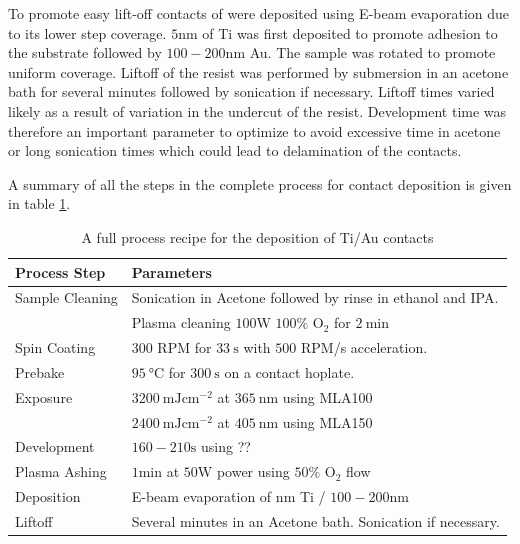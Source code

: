 To promote easy lift-off contacts of were deposited using E-beam evaporation due to its lower step coverage. $5 \si{\nano\meter}$ of Ti was first deposited to promote adhesion to the substrate followed by  $100 - 200\si{\nano\meter}$ Au. The sample was rotated to promote uniform coverage. Liftoff of the resist was performed by submersion in an acetone bath for several minutes followed by sonication if necessary. Liftoff times varied likely as a result of variation in the undercut of the resist. Development time was therefore an important parameter to optimize to avoid excessive time in acetone or long sonication times which could lead to delamination of the contacts. 

A summary of all the steps in the complete process for contact deposition is given in table \ref{Tab:recipe}.

\begin{table}[h]
\begin{center}
    \begin{tabular}{|l|l|  }
    \hline
    \textbf{Process Step} & \textbf{Parameters} \\ \hline
    Sample Cleaning & Sonication in Acetone followed by rinse in ethanol and IPA. \\ 
    &Plasma cleaning $100 \si{\watt}$  $100\%$ $\mathrm{O_2}$ for $ \SI{2}{\minute}$\\ \hline
    Spin Coating & $300$ RPM for $\SI{33}{\second}$ with $500$ RPM/s acceleration. \\ \hline 
   Prebake & $\SI{95}{\celsius}$ for $\SI{300}{\second}$ on a contact hoplate. \\ \hline
   Exposure & $\SI{3200}{\milli \joule \cm^{-2}}$ at $\SI{365}{\nm}$ using MLA100 \\
   & $\SI{2400}{\milli \joule \cm^{-2}}$ at $\SI{405}{\nm}$ using MLA150 \\\hline
   Development & $160-210 \si{\second}$ using ?? \\ \hline
   Plasma Ashing & $1 \si{\minute}$ at $50\si{\watt}$ power using $50\%$ $\mathrm{O_2}$ flow\\ \hline
   Deposition &  E-beam evaporation of $\si{\nano\meter}$  Ti /  $100 - 200\si{\nano\meter}$    \\\hline
   Liftoff & Several minutes in an Acetone bath. Sonication if necessary. \\ \hline
    \end{tabular}
\end{center}
\caption{A full process recipe for the deposition of Ti/Au contacts }
\label{Tab:recipe}
\end{table}

